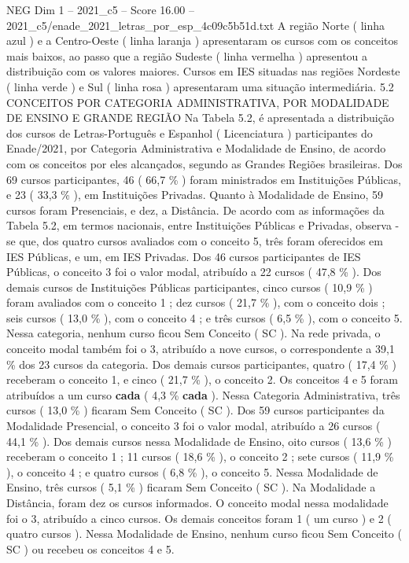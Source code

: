 \begin{textsample}{NEG Dim 1 – 2021\_c5 – Score 16.00 – 2021\_c5/enade\_2021\_letras\_por\_esp\_4c09c5b51d.txt}
A região Norte ( linha azul ) e a Centro-Oeste ( linha laranja ) apresentaram os cursos com os conceitos mais baixos, ao passo que a região Sudeste ( linha vermelha ) apresentou a distribuição com os valores maiores.
Cursos em IES situadas nas regiões Nordeste ( linha verde ) e Sul ( linha rosa ) apresentaram uma situação intermediária. 5.2 CONCEITOS POR CATEGORIA ADMINISTRATIVA, POR MODALIDADE DE ENSINO E GRANDE REGIÃO Na Tabela 5.2, é apresentada a distribuição dos cursos de Letras-Português e Espanhol ( Licenciatura ) participantes do Enade/2021, por Categoria Administrativa e Modalidade de Ensino, de acordo com os conceitos por eles alcançados, segundo as Grandes Regiões brasileiras.
Dos 69 cursos participantes, 46 ( 66,7 \% ) foram ministrados em Instituições Públicas, e 23 ( 33,3 \% ), em Instituições Privadas.
Quanto à Modalidade de Ensino, 59 cursos foram Presenciais, e dez, a Distância.
De acordo com as informações da Tabela 5.2, em termos nacionais, entre Instituições Públicas e Privadas, observa -se que, dos quatro cursos avaliados com o conceito 5, três foram oferecidos em IES Públicas, e um, em IES Privadas.
Dos 46 cursos participantes de IES Públicas, o conceito 3 foi o valor modal, atribuído a 22 cursos ( 47,8 \% ).
Dos demais cursos de Instituições Públicas participantes, cinco cursos ( 10,9 \% ) foram avaliados com o conceito 1 ; dez cursos ( 21,7 \% ), com o conceito dois ; seis cursos ( 13,0 \% ), com o conceito 4 ; e três cursos ( 6,5 \% ), com o conceito 5.
Nessa categoria, nenhum curso ficou Sem Conceito ( SC ).
Na rede privada, o conceito modal também foi o 3, atribuído a nove cursos, o correspondente a 39,1 \% dos 23 cursos da categoria.
Dos demais cursos participantes, quatro ( 17,4 \% ) receberam o conceito 1, e cinco ( 21,7 \% ), o conceito 2.
Os conceitos 4 e 5 foram atribuídos a um curso \textbf{cada} ( 4,3 \% \textbf{cada} ).
Nessa Categoria Administrativa, três cursos ( 13,0 \% ) ficaram Sem Conceito ( SC ).
Dos 59 cursos participantes da Modalidade Presencial, o conceito 3 foi o valor modal, atribuído a 26 cursos ( 44,1 \% ).
Dos demais cursos nessa Modalidade de Ensino, oito cursos ( 13,6 \% ) receberam o conceito 1 ; 11 cursos ( 18,6 \% ), o conceito 2 ; sete cursos ( 11,9 \% ), o conceito 4 ; e quatro cursos ( 6,8 \% ), o conceito 5.
Nessa Modalidade de Ensino, três cursos ( 5,1 \% ) ficaram Sem Conceito ( SC ).
Na Modalidade a Distância, foram dez os cursos informados.
O conceito modal nessa modalidade foi o 3, atribuído a cinco cursos.
Os demais conceitos foram 1 ( um curso ) e 2 ( quatro cursos ).
Nessa Modalidade de Ensino, nenhum curso ficou Sem Conceito ( SC ) ou recebeu os conceitos 4 e 5.

\end{textsample}
